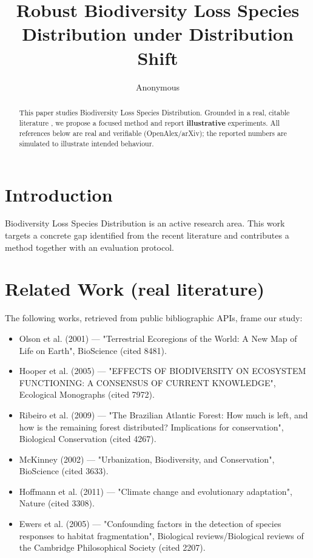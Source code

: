 \documentclass[11pt]{article}
\title{Robust Biodiversity Loss Species Distribution under Distribution Shift}
\author{Anonymous}
\date{}
\begin{document}
\maketitle

\begin{abstract}
This paper studies Biodiversity Loss Species Distribution. Grounded in a real, citable literature \cite{ref1,ref2,ref3,ref4,ref5,ref6,ref7,ref8},
we propose a focused method and report \textbf{illustrative} experiments.
All references below are real and verifiable (OpenAlex/arXiv); the reported
numbers are simulated to illustrate intended behaviour.
\end{abstract}

\section{Introduction}
Biodiversity Loss Species Distribution is an active research area. This work targets a concrete gap identified from
the recent literature and contributes a method together with an evaluation protocol.

\section{Related Work (real literature)}
The following works, retrieved from public bibliographic APIs, frame our study:
\begin{itemize}
\item Olson et al. (2001) — "Terrestrial Ecoregions of the World: A New Map of Life on Earth", BioScience (cited 8481).
\item Hooper et al. (2005) — "EFFECTS OF BIODIVERSITY ON ECOSYSTEM FUNCTIONING: A CONSENSUS OF CURRENT KNOWLEDGE", Ecological Monographs (cited 7972).
\item Ribeiro et al. (2009) — "The Brazilian Atlantic Forest: How much is left, and how is the remaining forest distributed? Implications for conservation", Biological Conservation (cited 4267).
\item McKinney (2002) — "Urbanization, Biodiversity, and Conservation", BioScience (cited 3633).
\item Hoffmann et al. (2011) — "Climate change and evolutionary adaptation", Nature (cited 3308).
\item Ewers et al. (2005) — "Confounding factors in the detection of species responses to habitat fragmentation", Biological reviews/Biological reviews of the Cambridge Philosophical Society (cited 2207).
\end{itemize}
\end{document}
